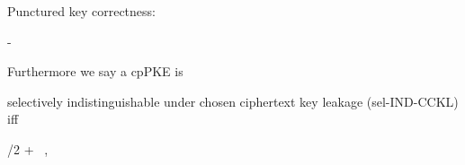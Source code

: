 \begin{definition}
\begin{sitemize}
        \item Punctured key correctness:
        \begin{bralign}
             - \negl\parr{\secpar}
        \end{bralign}
    \end{sitemize}
    Furthermore we say a cpPKE is
    \begin{sitemize}
        \item selectively indistinguishable under chosen ciphertext key leakage (sel-IND-CCKL) iff
        \begin{bralign}
            /2 + \negl\parr{\secpar}
            \ ,
        \end{bralign}


\end{sitemize}
\end{definition}
